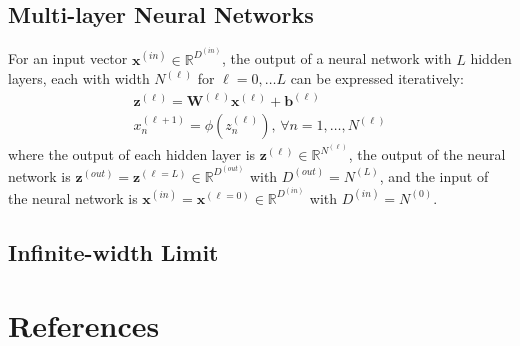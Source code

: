 \documentclass[twoside,11pt]{article}
\begin{document}
\subsection{Multi-layer Neural Networks}
For an input vector $\mathbf{x}^{(in)} \in \mathbb{R}^{D^{(in)}}$, the output of a neural network with $L$ hidden layers, each with width $N^{(\ell)}$ for $\ell = 0, \dots L$ can be expressed iteratively:
\begin{align}
    \label{multi-layer-hidden}
    \mathbf{z}^{(\ell)} = \mathbf{W}^{(\ell)} \mathbf{x}^{(\ell)} + \mathbf{b}^{(\ell)}\\
    \label{multi-layer-hidden-non-linearity}
    x_n^{(\ell+1)} = \phi(z_n^{(\ell)})\text{, } \forall n = 1, \dots, N^{(\ell)}
\end{align}
where the output of each hidden layer is $\mathbf{z}^{(\ell)} \in \mathbb{R}^{N^{(\ell)}}$, the output of the neural network is $\mathbf{z}^{(out)} = \mathbf{z}^{(\ell=L)} \in \mathbb{R}^{D^{(out)}}$ with $D^{(out)} = N^{(L)}$, and the input of the neural network is $\mathbf{x}^{(in)} = \mathbf{x}^{(\ell = 0)} \in \mathbb{R}^{D^{(in)}}$ with $D^{(in)} = N^{(0)}$.
\subsection{Infinite-width Limit}

\begingroup
\let\clearpage\relax
\AtNextBibliography{\small}
\section*{References}
\printbibliography[heading=talikarng, title = {References}]
\endgroup
\end{document}
